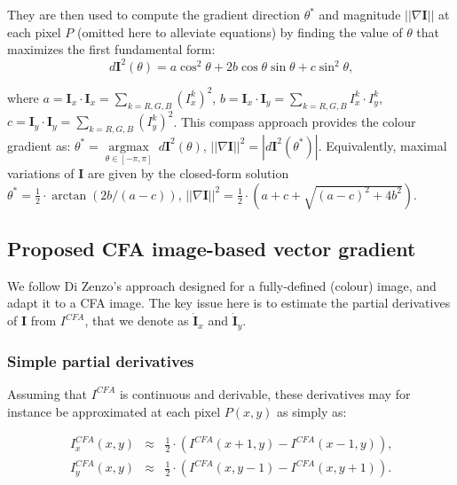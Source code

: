 \documentclass[twoside]{article}
\begin{document}
\noindent They are then used to compute the gradient direction $\theta^{*}$ and magnitude $||\nabla \mathbf{I}||$ at each pixel $P$ (omitted here to alleviate equations) by finding the value of $\theta$ that maximizes the first fundamental form:
\begin{equation}\label{eq:dI^2}
	d \textbf{I}^2(\theta)= a \cos^2 \theta + 2 b\cos \theta \sin \theta + c \sin^2 \theta \text{,}
\end{equation}

\noindent where $a = \textbf{I}_x \cdot \textbf{I}_x = \sum_{k=R,G,B} (I^k_x)^2$, $b = \textbf{I}_x \cdot \textbf{I}_y = \sum_{k=R,G,B} I^k_x \cdot I^k_y$, $c = \textbf{I}_y \cdot \textbf{I}_y = \sum_{k=R,G,B} (I^k_y)^2$. This compass approach provides the colour gradient as: $\theta^{*} = \underset{\theta \in [-\pi,\pi]}{\operatorname{argmax}}~d \textbf{I}^2(\theta)$, $||\nabla \mathbf{I}||^2 = \left| d \textbf{I}^2( \theta^{*}) \right|$. Equivalently, maximal variations of $\mathbf{I}$ are given by the closed-form solution $\theta^{*} = \frac{1}{2} \cdot \arctan \left( 2b / (a-c) \right)$, $||\nabla \mathbf{I}||^2=\frac{1}{2} \cdot \left( a + c+ \sqrt{(a-c)^2+4b^2} \right)$. 


\subsection{Proposed CFA image-based vector gradient}
\label{subsec:cfa_gradient}

We follow Di Zenzo's approach designed for a fully-defined (colour) image, and adapt it to a CFA image. The key issue here is to estimate the partial derivatives of $\mathbf{I}$ from $I^{CFA}$, that we denote as $\dot{\textbf{I}}_x$ and $\dot{\textbf{I}}_y$.


\subsubsection{Simple partial derivatives}
\label{Simple partial derivative}
Assuming that $I^{CFA}$ is continuous and derivable, these derivatives may for instance be approximated at each pixel $P(x,y)$ as simply as:

\begin{equation}
	\begin{array}{rcl}
		I^{CFA}_x(x,y) &\approx& \frac{1}{2} \cdot \left( I^{CFA}(x+1,y) - I^{CFA}(x-1,y) \right) \text{,} \\
		I^{CFA}_y(x,y) &\approx& \frac{1}{2} \cdot \left( I^{CFA}(x,y-1) - I^{CFA}(x,y+1) \right) \text{.}
	\end{array}
	\label{eq:partial_cfa_derivatives}
\end{equation}
\end{document}
